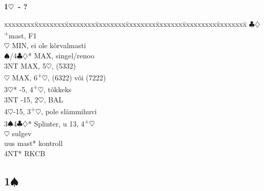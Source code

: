 \documentclass[10pt]{article}
\renewcommand{\c}{$\clubsuit$}
\renewcommand{\d}{$\diamondsuit$}
\newcommand{\h}{$\heartsuit$}
\newcommand{\s}{$\spadesuit$}
\newcommand{\p}{\textsuperscript{+}}
\newcommand{\m}{\textsuperscript{\textminus}}
\newenvironment{bidtable}[1][]
{\textbf{#1}
  \begin{adjustwidth}{1em}{}
    \addvspace{2pt}
    \begin{tabbing}
      xxxxxxxx\=xxxxxxxx\=xxxxxxxx\=xxxxxxxx\=xxxxxxxx\=xxxxxxx\=xxxxxxxxx\=xxxxxxxx\=\kill}
{\end{tabbing}\end{adjustwidth}\bigskip}%
\newcommand{\pdfs}{\texorpdfstring{\s{}}{S}}
\begin{document}
\begin{bidtable}[1\h\ - ?]
           \c\d      {}\p mast, F1                  \\
           \h        \> MIN, ei ole kõrvalmasti       \\
           \s/4\c\d* \> MAX, singel/renoo             \\
           \> 3NT        \> MAX, 5\h, (5332)              \\
           \h        \> MAX, 6\p\h, (6322) või (7222) \\
3\h*       {}-5, 4\p\h, tõkkeks                         \\
3NT        -15, 2\m\h, BAL                           \\
4\h        {}-15, 3\p\h, pole slämmihuvi               \\
3\s 4\c\d* \> Splinter, u 13, 4\p\h                       \\
           \h        \> sulgev                        \\
           \> uus mast*  \> kontroll                      \\
           \> 4NT*       \> RKCB
\end{bidtable}



\subsection{1\pdfs}
\end{document}
